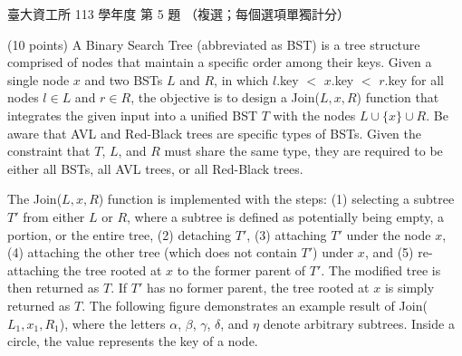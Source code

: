 \begin{pastexam}[label={px:ntu-113-dsa-05}]{臺大資工所 113 學年度 第 5 題}
（複選；每個選項單獨計分）

(10 points) A Binary Search Tree (abbreviated as BST) is a tree structure comprised of nodes that
maintain a specific order among their keys. Given a single node $x$ and two BSTs $L$ and $R$, in
which $l$.key $<$ $x$.key $<$ $r$.key for all nodes $l\in L$ and $r\in R$, the objective is to design a
Join($L,x,R$) function that integrates the given input into a unified BST $T$ with the nodes
$L\cup\{x\}\cup R$. Be aware that AVL and Red-Black trees are specific types of BSTs. Given the
constraint that $T$, $L$, and $R$ must share the same type, they are required to be either all BSTs,
all AVL trees, or all Red-Black trees.

The Join($L,x,R$) function is implemented with the steps: (1) selecting a subtree $T'$ from either
$L$ or $R$, where a subtree is defined as potentially being empty, a portion, or the entire tree, (2)
detaching $T'$, (3) attaching $T'$ under the node $x$, (4) attaching the other tree (which does not
contain $T'$) under $x$, and (5) re-attaching the tree rooted at $x$ to the former parent of $T'$. The
modified tree is then returned as $T$. If $T'$ has no former parent, the tree rooted at $x$ is simply
returned as $T$. The following figure demonstrates an example result of Join($L_1,x_1,R_1$), where the
letters $\alpha$, $\beta$, $\gamma$, $\delta$, and $\eta$ denote arbitrary subtrees. Inside a circle,
the value represents the key of a node.
\begin{center}
\end{center}
\end{pastexam}
